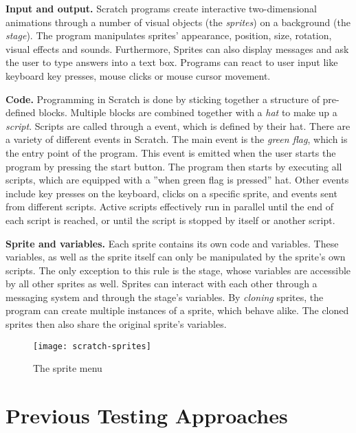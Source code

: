 \textbf{Input and output.}
Scratch programs create interactive two-dimensional animations through a number of visual objects (the \textit{sprites}) on a background (the \textit{stage}).
The program manipulates sprites' appearance, position, size, rotation, visual effects and sounds.
Furthermore, Sprites can also display messages and ask the user to type answers into a text box.
Programs can react to user input like keyboard key presses, mouse clicks or mouse cursor movement.

\textbf{Code.}
Programming in Scratch is done by sticking together a structure of pre-defined blocks.
Multiple blocks are combined together with a \textit{hat} to make up a \textit{script}.
Scripts are called through a event, which is defined by their hat. %
There are a variety of different events in Scratch.
The main event is the \textit{green flag}, which is the entry point of the program.
This event is emitted when the user starts the program by pressing the start button.
The program then starts by executing all scripts, which are equipped with a ''when green flag is pressed'' hat.
Other events include key presses on the keyboard, clicks on a specific sprite, and events sent from different scripts.
Active scripts effectively run in parallel until the end of each script is reached, or until the script is stopped by itself or another script.

\textbf{Sprite and variables.}
Each sprite contains its own code and variables.
These variables, as well as the sprite itself can only be manipulated by the sprite's own scripts.
The only exception to this rule is the stage, whose variables are accessible by all other sprites as well.
Sprites can interact with each other through a messaging system and through the stage's variables.
By \textit{cloning} sprites, the program can create multiple instances of a sprite, which behave alike.
The cloned sprites then also share the original sprite's variables.

\begin{wrapfigure}{r}{0.45\textwidth + 5mm}
    \centering
    \vspace{-4mm}
    \texttt{[image: scratch-sprites]}
    \caption{The sprite menu}
    \label{fig:the_sprite_menu}
\end{wrapfigure}

\section{Previous Testing Approaches}%
\label{sec:previous_testing_approaches}

